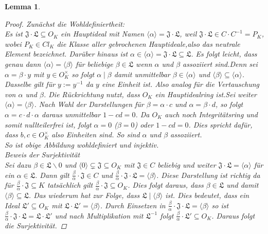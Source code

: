 \documentclass[10pt,a4paper]{article}
\theoremstyle{plain}
\newtheorem{lem}[thm]{Lemma}
\theoremstyle{definition}
\theoremstyle{remark}
\begin{document}
\begin{lem}
\begin{proof}
Zunächst die Wohldefiniertheit:
\\
Es ist $\mathfrak{J\cdot L}\subseteq O_K$ ein Hauptideal mit Namen $\langle \alpha \rangle=\mathfrak{J\cdot L}$, weil $\mathfrak{J\cdot L} \in C\cdot C^{-1} = P_K$, wobei $P_K \in Cl_K$ die Klasse aller gebrochenen Hauptideale,also das neutrale Element bezeichnet. Darüber hinaus ist $\alpha \in \langle \alpha \rangle=\mathfrak{J\cdot L}\subseteq \mathfrak{L}$. Es folgt leicht, dass genau dann $\langle \alpha \rangle=\langle \beta \rangle$ für beliebige $\beta \in \mathfrak{L}$ wenn $\alpha$ und $\beta$ assoziiert sind.Denn sei $\alpha=\beta \cdot y$ mit $y \in O_K^{\times}$ so folgt $\alpha \mid \beta$ damit unmittelbar $\beta \in \langle \alpha \rangle$ und $\langle \beta \rangle  \subseteq \langle \alpha \rangle$. Dasselbe gilt für $y:= y^{-1}$ da $y$ eine Einheit ist. Also analog für die Vertauschung von $\alpha$ und $\beta$. Die Rückrichtung nutzt, dass $O_K$ ein Hauptidealring ist.Sei weiter $\langle \alpha \rangle=\langle \beta \rangle$. Nach Wahl der Darstellungen für $\beta=\alpha\cdot c$ und $\alpha=\beta\cdot d$, so folgt $\alpha=c\cdot d \cdot \alpha$ daraus unmittelbar $1-cd=0$. Da $O_K$ auch noch Integritätsring und somit nullteilerfrei ist, folgt $\alpha=0$  ($\beta =0$) oder $1-cd=0$. Dies spricht dafür, dass $b,c \in O_K^{\times}$ also Einheiten sind. So sind $\alpha$ und $\beta$ assoziiert.
\\
So ist obige Abbildung wohldefiniert und injektiv.
\\
\textit{Beweis} der Surjektivität
\\
Sei dazu $\beta \in \mathfrak{L}\backslash{0}$ und  $\langle 0 \rangle \subsetneq \mathfrak{J} \subseteq O_K$ mit $\mathfrak{J} \in C$ beliebig und weiter $\mathfrak{J\cdot L}= \langle \alpha \rangle$ für ein $\alpha \in \mathfrak{L}$. Dann gilt $\frac{\beta}{\alpha} \cdot \mathfrak{J} \in C$ und $\frac{\beta}{\alpha} \cdot \mathfrak{J\cdot L} = \langle \beta\rangle$. Diese Darstellung ist richtig da für $\frac{\beta}{\alpha} \cdot \mathfrak{J} \subseteq K$ tatsächlich gilt $\frac{\beta}{\alpha} \cdot \mathfrak{J} \subseteq O_K$. Dies folgt daraus, dass $\beta \in \mathfrak{L}$ und damit $\langle \beta \rangle \subseteq \mathfrak{L}$. Das wiederum hat zur Folge, dass $\mathfrak{L}\mid \langle \beta \rangle$ ist. Dies bedeutet, dass ein Ideal $\mathfrak{L'}\subseteq O_K$ mit $\mathfrak{L\cdot L'}= \langle \beta \rangle$. Durch Einsetzen in $\frac{\beta}{\alpha} \cdot \mathfrak{J\cdot L} = \langle \beta\rangle$ so ist $\frac{\beta}{\alpha} \cdot \mathfrak{J\cdot L} = \mathfrak{L \cdot L'} $ und nach Multiplikation mit $\mathfrak{L^{-1}}$ folgt $\frac{\beta}{\alpha} \cdot \mathfrak{L'}\subseteq O_K$. Daraus folgt die Surjektivität.

\end{proof}
\end{lem}
\end{document}
